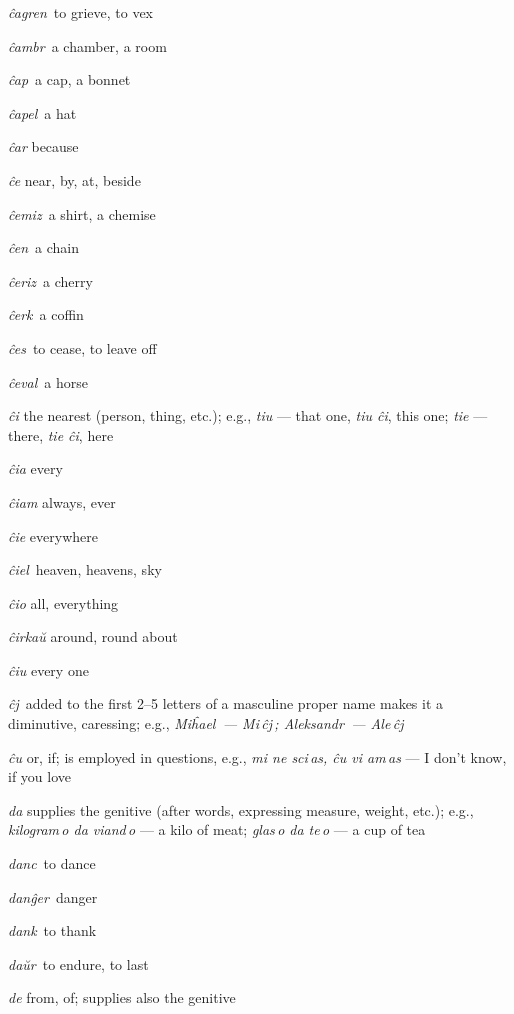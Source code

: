 \begin{landscape}
\begin{multicols}{5}

\begin{outdent}{1em}
\emph{ĉagren\,} to grieve, to vex

\emph{ĉambr\,} a chamber, a room

\emph{ĉap\,} a cap, a bonnet

\emph{ĉapel\,} a hat

\emph{ĉar} because

\emph{ĉe} near, by, at, beside

\emph{ĉemiz\,} a shirt, a chemise

\emph{ĉen\,} a chain

\emph{ĉeriz\,} a cherry

\emph{ĉerk\,} a coffin

\emph{ĉes\,} to cease, to leave off

\emph{ĉeval\,} a horse

\emph{ĉi} the nearest (person, thing, etc.); e.g., \emph{tiu} — that one, \emph{tiu ĉi}, this one; \emph{tie} — there, \emph{tie ĉi}, here

\emph{ĉia} every

\emph{ĉiam} always, ever

\emph{ĉie} everywhere

\emph{ĉiel\,} heaven, heavens, sky

\emph{ĉio} all, everything

\emph{ĉirkaŭ} around, round about

\emph{ĉiu} every one

\emph{ĉj\,} added to the first 2--5 letters of a masculine proper name makes it a diminutive, caressing; e.g., \emph{Miĥael\, — Mi\,ĉj\,; Aleksandr\, — Ale\,ĉj\,} 

\emph{ĉu} or, if; is employed in questions, e.g., \emph{mi ne sci\,as, ĉu vi am\,as} — I don’t know, if you love
\end{outdent}


\begin{outdent}{1em}
\emph{da} supplies the genitive (after words, expressing measure, weight, etc.); e.g., \emph{kilogram\,o da viand\,o} — a kilo of meat; \emph{glas\,o da te\,o} — a cup of tea

\emph{danc\,} to dance

\emph{danĝer\,} danger

\emph{dank\,} to thank

\emph{daŭr\,} to endure, to last

\emph{de} from, of; supplies also the genitive


\end{outdent}
\end{multicols}
\end{landscape}
